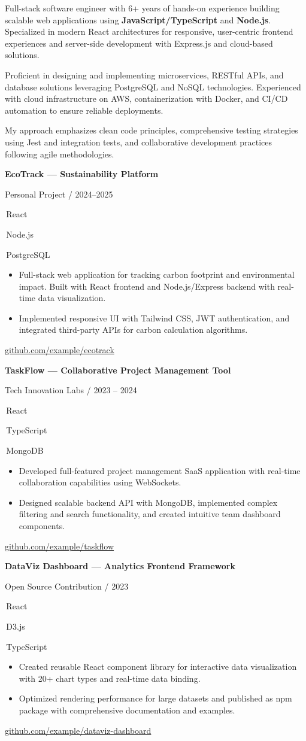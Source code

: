 \documentclass[10pt,a4paper]{article}
\newcommand{\cvtag}[2]{%
  \leavevmode
  {%
    \setlength{\fboxsep}{2.8pt}%
    \colorbox{#1}{%
      \color{white}\bfseries\fontsize{6.5}{8}\selectfont\strut\,#2\,%
    }%
  }%
  \hspace{2pt}%
}
\newcommand{\tagP}[1]{\cvtag{ColorTagPrimary}{#1}}
\newcommand{\mainSection}[1]{%
  \vspace{13pt}{\color{ColorSidebarBg}\fontsize{10}{12}\selectfont\bfseries\MakeUppercase{#1}}\par
  \vspace{-2pt}{\color{ColorAccent}\rule{40mm}{1.2pt}}\par\vspace{6pt}}
\newcommand{\project}[5]{%
  {\fontsize{9.5}{11}\selectfont\bfseries\color{ColorMainText}#1}\par
  {\fontsize{8}{10}\selectfont\color{ColorMuted}#2}\par
  \vspace{2pt}#3\par
  {\fontsize{8.5}{12}\selectfont\color{ColorMainText}\begin{itemize}#4\end{itemize}}
  {\fontsize{8}{10}\selectfont\href{https://#5}{\color{ColorAccent}#5}}\par\vspace{8pt}}
\begin{document}
\vspace*{.5em}
\mainSection{Professional Profile}
{\fontsize{9}{13}\selectfont\color{ColorMainText}


Full-stack software engineer with 6+ years of hands-on experience building scalable web applications using \textbf{JavaScript/TypeScript} and \textbf{Node.js}. Specialized in modern React architectures for responsive, user-centric frontend experiences and server-side development with Express.js and cloud-based solutions.

Proficient in designing and implementing microservices, RESTful APIs, and database solutions leveraging PostgreSQL and NoSQL technologies. Experienced with cloud infrastructure on AWS, containerization with Docker, and CI/CD automation to ensure reliable deployments.

My approach emphasizes clean code principles, comprehensive testing strategies using Jest and integration tests, and collaborative development practices following agile methodologies.

}\par

\mainSection{Featured Projects}
\project%
  {EcoTrack --- Sustainability Platform}%
  {Personal Project / 2024--2025}%
  {\tagP{React}\tagP{Node.js}\tagP{PostgreSQL}}%
  {%
    \item Full-stack web application for tracking carbon footprint and environmental impact. Built with React frontend and Node.js/Express backend with real-time data visualization.
    \item Implemented responsive UI with Tailwind CSS, JWT authentication, and integrated third-party APIs for carbon calculation algorithms.
  }%
  {github.com/example/ecotrack}

\project%
  {TaskFlow --- Collaborative Project Management Tool}%
  {Tech Innovation Labs / 2023 -- 2024}%
  {\tagP{React}\tagP{TypeScript}\tagP{MongoDB}}%
  {%
    \item Developed full-featured project management SaaS application with real-time collaboration capabilities using WebSockets.
    \item Designed scalable backend API with MongoDB, implemented complex filtering and search functionality, and created intuitive team dashboard components.
  }%
  {github.com/example/taskflow}

\project%
  {DataViz Dashboard --- Analytics Frontend Framework}%
  {Open Source Contribution / 2023}%
  {\tagP{React}\tagP{D3.js}\tagP{TypeScript}}%
  {%
    \item Created reusable React component library for interactive data visualization with 20+ chart types and real-time data binding.
    \item Optimized rendering performance for large datasets and published as npm package with comprehensive documentation and examples.
  }%
  {github.com/example/dataviz-dashboard}
\end{document}
